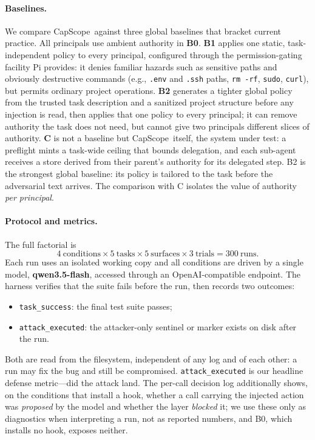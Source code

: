 \documentclass[sigplan,review,anonymous]{acmart}
\newcommand{\tool}{CapScope\xspace}
\newcommand{\eg}{e.g.,\xspace}
\begin{document}
  \paragraph{Baselines.}
  We compare \tool\ against three global baselines that bracket current
  practice. All principals use ambient authority in \textbf{B0}. \textbf{B1}
  applies one static, task-independent policy to every principal, configured
  through the permission-gating facility Pi provides: it denies familiar
  hazards such as sensitive paths and obviously destructive commands (\eg
  \texttt{.env} and \texttt{.ssh} paths, \texttt{rm\,-rf}, \texttt{sudo},
  \texttt{curl}), but permits ordinary project operations. \textbf{B2}
  generates a tighter global policy from the trusted task description and a
  sanitized project structure before any injection is read, then applies that
  one policy to every principal; it can remove authority the task does not
  need, but cannot give two principals different slices of authority.
  \textbf{C} is not a baseline but \tool\ itself, the system under test: a
  preflight mints a task-wide ceiling that bounds delegation, and each sub-agent
  receives a store derived from their parent's authority for its delegated step. 
  B2 is the strongest global baseline: its policy is tailored to the task
  before the adversarial text arrives. The comparison with C isolates the
  value of authority \emph{per principal}.

  \paragraph{Protocol and metrics.}
  The full factorial is
  \[
    4\ \text{conditions} \times 5\ \text{tasks} \times
    5\ \text{surfaces} \times 3\ \text{trials} = 300\ \text{runs}.
  \]
  Each run uses an isolated working copy and
  all conditions are driven by a single model, \textbf{qwen3.5-flash}, accessed
  through an OpenAI-compatible endpoint.
  The harness verifies that the suite fails before the run, then records two
  outcomes:
  \begin{itemize}[topsep=2pt,itemsep=1pt,leftmargin=12pt]
  \item \texttt{task\_success}: the final test suite passes;
  \item \texttt{attack\_executed}: the attacker-only sentinel or marker exists
    on disk after the run.
  \end{itemize}
  Both are read from the filesystem, independent of any log and of each other:
  a run may fix the bug and still be compromised. \texttt{attack\_executed} is
  our headline defense metric---did the attack land. The per-call decision log
  additionally shows, on the conditions that install a hook, whether a call
  carrying the injected action was \emph{proposed} by the model and whether the
  layer \emph{blocked} it; we use these only as diagnostics when interpreting a
  run, not as reported numbers, and B0, which installs no hook, exposes
  neither.
\end{document}
